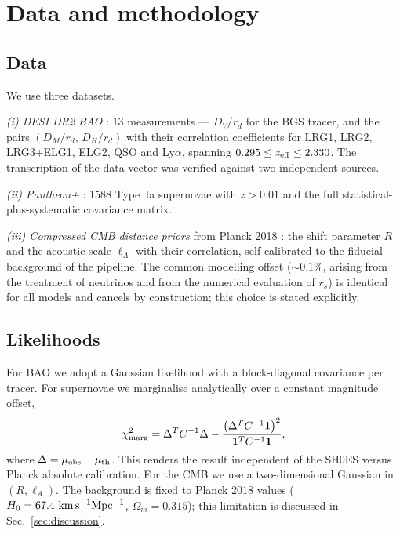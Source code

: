 \documentclass[aps,prd,twocolumn,superscriptaddress,nofootinbib,floatfix]{revtex4-2}
\begin{document}
\section{Data and methodology}
\label{sec:data}

\subsection{Data}

We use three datasets.

\emph{(i) DESI DR2 BAO} \cite{DESI2025}: 13 measurements ---
$D_V/r_d$ for the BGS tracer, and the pairs
$(D_M/r_d,\,D_H/r_d)$ with their correlation coefficients for LRG1,
LRG2, LRG3+ELG1, ELG2, QSO and Ly$\alpha$, spanning
$0.295\le z_{\rm eff}\le2.330$. The transcription of the data vector was
verified against two independent sources.

\emph{(ii) Pantheon+} \cite{Scolnic2022}: 1588 Type~Ia supernovae with
$z>0.01$ and the full statistical-plus-systematic covariance matrix.

\emph{(iii) Compressed CMB distance priors} from Planck 2018
\cite{Planck2020,Chen2019}: the shift parameter $R$ and the acoustic
scale $\ell_A$ with their correlation, self-calibrated to the fiducial
background of the pipeline. The common modelling offset ($\sim0.1\%$,
arising from the treatment of neutrinos and from the numerical
evaluation of $r_s$) is identical for all models and cancels by
construction; this choice is stated explicitly.

\subsection{Likelihoods}

For BAO we adopt a Gaussian likelihood with a block-diagonal covariance
per tracer. For supernovae we marginalise analytically over a constant
magnitude offset,
%
\begin{equation}
\chi^2_{\rm marg}=\Delta^{T}C^{-1}\Delta
-\frac{\left(\Delta^{T}C^{-1}\mathbf{1}\right)^2}
{\mathbf{1}^{T}C^{-1}\mathbf{1}},
\label{eq:marg}
\end{equation}
%
where $\Delta=\mu_{\rm obs}-\mu_{\rm th}$. This renders the result
independent of the SH0ES versus Planck absolute calibration. For the CMB
we use a two-dimensional Gaussian in $(R,\ell_A)$. The background is
fixed to Planck 2018 values ($H_0=67.4~{\rm km\,s^{-1}Mpc^{-1}}$,
$\Omega_m=0.315$); this limitation is discussed in
Sec.~\ref{sec:discussion}.
\end{document}
